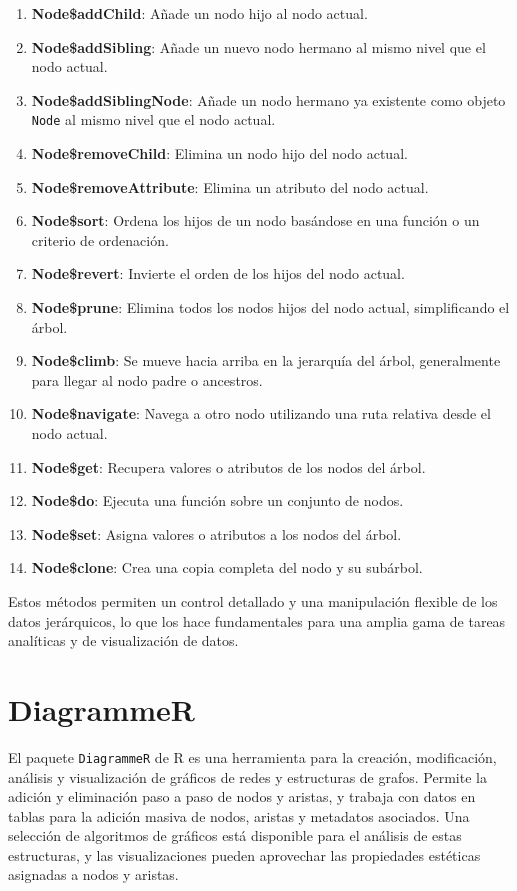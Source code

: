 \documentclass[12pt]{report}\usepackage[]{graphicx}\usepackage[dvipsnames]{xcolor}
\begin{document}
 	\begin{enumerate}
 		\item \textbf{Node\$addChild}: Añade un nodo hijo al nodo actual.
 		\item \textbf{Node\$addSibling}: Añade un nuevo nodo hermano al mismo nivel que el nodo actual.
 		\item \textbf{Node\$addSiblingNode}: Añade un nodo hermano ya existente como objeto \texttt{Node} al mismo nivel que el nodo actual.
 		\item \textbf{Node\$removeChild}: Elimina un nodo hijo del nodo actual.
 		\item \textbf{Node\$removeAttribute}: Elimina un atributo del nodo actual.
 		\item \textbf{Node\$sort}: Ordena los hijos de un nodo basándose en una función o un criterio de ordenación.
 		\item \textbf{Node\$revert}: Invierte el orden de los hijos del nodo actual.
 		\item \textbf{Node\$prune}: Elimina todos los nodos hijos del nodo actual, simplificando el árbol.
 		\item \textbf{Node\$climb}: Se mueve hacia arriba en la jerarquía del árbol, generalmente para llegar al nodo padre o ancestros.
 		\item \textbf{Node\$navigate}: Navega a otro nodo utilizando una ruta relativa desde el nodo actual.
 		\item \textbf{Node\$get}: Recupera valores o atributos de los nodos del árbol.
 		\item \textbf{Node\$do}: Ejecuta una función sobre un conjunto de nodos.
 		\item \textbf{Node\$set}: Asigna valores o atributos a los nodos del árbol.
 		\item \textbf{Node\$clone}: Crea una copia completa del nodo y su subárbol.
 	\end{enumerate}
 	
 	Estos métodos permiten un control detallado y una manipulación flexible de los datos jerárquicos, lo que los hace fundamentales para una amplia gama de tareas analíticas y de visualización de datos.
 	
 	\section{DiagrammeR}
 	
 	El paquete \texttt{DiagrammeR} de R es una herramienta para la creación, modificación, análisis y visualización de gráficos de redes y estructuras de grafos. Permite la adición y eliminación paso a paso de nodos y aristas, y trabaja con datos en tablas para la adición masiva de nodos, aristas y metadatos asociados. Una selección de algoritmos de gráficos está disponible para el análisis de estas estructuras, y las visualizaciones pueden aprovechar las propiedades estéticas asignadas a nodos y aristas.\\
 	
\end{document}
